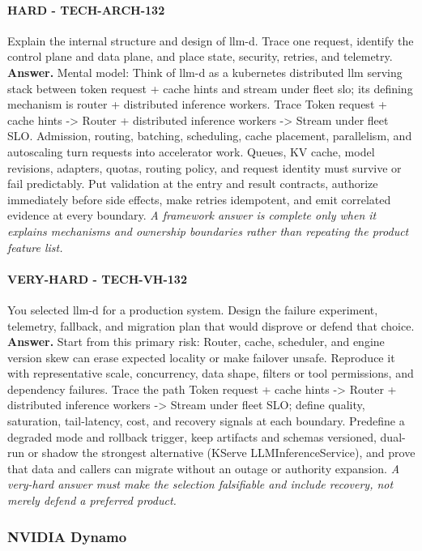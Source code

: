 \paragraph{HARD - TECH-ARCH-132} Explain the internal structure and design of llm-d. Trace one request, identify the control plane and data plane, and place state, security, retries, and telemetry.
\textbf{Answer.} Mental model: Think of llm-d as a kubernetes distributed llm serving stack between token request + cache hints and stream under fleet slo; its defining mechanism is router + distributed inference workers. Trace Token request + cache hints -> Router + distributed inference workers -> Stream under fleet SLO. Admission, routing, batching, scheduling, cache placement, parallelism, and autoscaling turn requests into accelerator work. Queues, KV cache, model revisions, adapters, quotas, routing policy, and request identity must survive or fail predictably. Put validation at the entry and result contracts, authorize immediately before side effects, make retries idempotent, and emit correlated evidence at every boundary.
\textit{A framework answer is complete only when it explains mechanisms and ownership boundaries rather than repeating the product feature list.}
\paragraph{VERY-HARD - TECH-VH-132} You selected llm-d for a production system. Design the failure experiment, telemetry, fallback, and migration plan that would disprove or defend that choice.
\textbf{Answer.} Start from this primary risk: Router, cache, scheduler, and engine version skew can erase expected locality or make failover unsafe. Reproduce it with representative scale, concurrency, data shape, filters or tool permissions, and dependency failures. Trace the path Token request + cache hints -> Router + distributed inference workers -> Stream under fleet SLO; define quality, saturation, tail-latency, cost, and recovery signals at each boundary. Predefine a degraded mode and rollback trigger, keep artifacts and schemas versioned, dual-run or shadow the strongest alternative (KServe LLMInferenceService), and prove that data and callers can migrate without an outage or authority expansion.
\textit{A very-hard answer must make the selection falsifiable and include recovery, not merely defend a preferred product.}
\subsubsection*{NVIDIA Dynamo}
